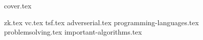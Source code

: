 \documentclass[11pt]{book}
\begin{document}
{cover.tex}

\tableofcontents

{zk.tex}
{vc.tex}
{tsf.tex}
{adverserial.tex}
{programming-languages.tex}
{problemsolving.tex}
{important-algorithms.tex}

\clearpage\printindex
\end{document}
